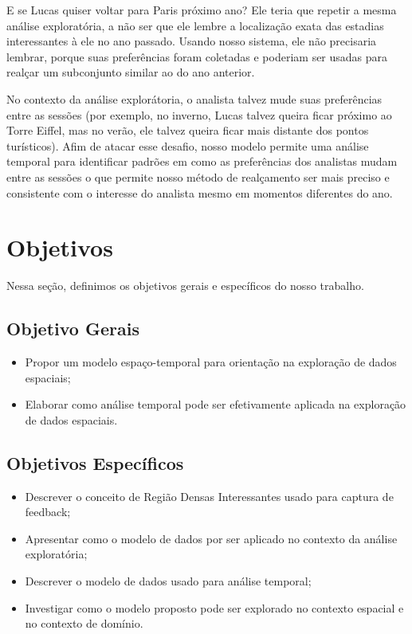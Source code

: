 E se Lucas quiser voltar para Paris próximo ano? Ele teria que repetir a mesma análise exploratória, a não ser que ele lembre a localização exata das estadias interessantes à ele no ano passado. Usando nosso sistema, ele não precisaria lembrar, porque suas preferências foram coletadas e poderiam ser usadas para realçar um subconjunto similar ao do ano anterior.

No contexto da análise explorátoria, o analista talvez mude suas preferências entre as sessões (por exemplo, no inverno, Lucas talvez queira ficar próximo ao Torre Eiffel, mas no verão, ele talvez queira ficar mais distante dos pontos turísticos). Afim de atacar esse desafio, nosso modelo permite uma análise temporal para identificar padrões em como as preferências dos analistas mudam entre as sessões o que permite nosso método de realçamento ser mais preciso e consistente com o interesse do analista mesmo em momentos diferentes do ano.

\section{Objetivos}

Nessa seção, definimos os objetivos gerais e específicos do nosso trabalho.

\subsection{Objetivo Gerais}

\begin{itemize}
	\item Propor um modelo espaço-temporal para orientação na exploração de dados espaciais;
	\item Elaborar como análise temporal pode ser efetivamente aplicada na exploração de dados espaciais.
\end{itemize}

\subsection{Objetivos Específicos}

\begin{itemize}
	\item Descrever o conceito de Região Densas Interessantes usado para captura de feedback;
	\item Apresentar como o modelo de dados por ser aplicado no contexto da análise exploratória;
	\item Descrever o modelo de dados usado para análise temporal;
	\item Investigar como o modelo proposto pode ser explorado no contexto espacial e no contexto de domínio.
\end{itemize}


